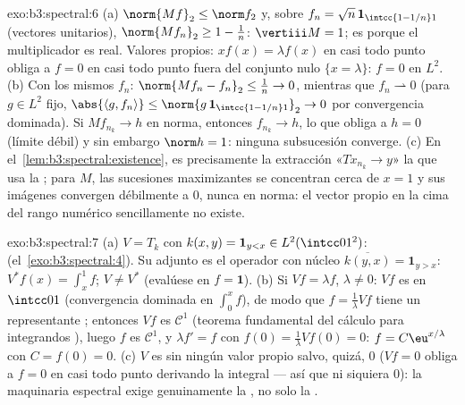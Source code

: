 \begin{solution}{exo:b3:spectral:6}
(a) $\norm{Mf}_2 \leq \norm f_2$ y, sobre $f_n = \sqrt n\,
\mathbf 1_{\intcc{1 - 1/n}1}$ (vectores unitarios), $\norm{Mf_n}_2
\geq 1 - \frac1n$: $\vertiii M = 1$; es
 porque el
multiplicador es real. Valores propios: $xf(x) = \lambda f(x)$ en casi
todo punto obliga a $f = 0$ en casi todo punto fuera del conjunto nulo
$\{x = \lambda\}$: $f =
0$ en $L^2$. (b) Con los mismos $f_n$:
$\norm{Mf_n - f_n}_2 \leq \frac1n \to
0$, mientras que $f_n \rightharpoonup 0$ (para $g \in L^2$ fijo,
$\abs{\langle g, f_n\rangle} \leq \norm{g\,\mathbf
1_{\intcc{1-1/n}1}}_2 \to 0$ por convergencia dominada). Si
$Mf_{n_k} \to h$ en norma, entonces $f_{n_k} \to h$, lo que obliga a
$h = 0$ (límite débil) y sin embargo $\norm h = 1$: ninguna subsucesión
converge. (c) En el~\cref{lem:b3:spectral:existence}, es precisamente la
extracción «$Tx_{n_k} \to y$» la que usa la ; para $M$, las
sucesiones maximizantes se concentran cerca de $x = 1$ y sus imágenes
convergen débilmente a $0$, nunca en norma: el vector propio en la cima
del rango numérico sencillamente no existe.
\end{solution}

\begin{solution}{exo:b3:spectral:7}
(a) $V = T_k$ con $k(x, y) = \mathbf 1_{y < x} \in
L^2(\intcc01^2)$: 
(el~\cref{exo:b3:spectral:4}). Su adjunto es el operador con núcleo
$\overline{k(y,
x)} = \mathbf 1_{y > x}$: $V^*f(x) = \int_x^1f$; $V \neq V^*$ (evalúese
en $f = \mathbf 1$). (b) Si $Vf = \lambda f$, $\lambda \ne 0$: $Vf$ es
 en $\intcc01$
(convergencia dominada en $\int_0^x f$), de modo que $f
= \frac1\lambda Vf$ tiene un representante
; entonces $Vf$ es
$\mathcal C^1$ (teorema fundamental del cálculo para integrandos
), luego $f$ es
$\mathcal C^1$, y $\lambda f' = f$ con $f(0) = \frac1\lambda Vf(0) = 0$:
$f =
C\eu^{x/\lambda}$ con $C = f(0) = 0$. (c) $V$ es
 sin ningún valor propio
salvo, quizá, $0$ ($Vf = 0$ obliga a $f = 0$ en casi todo punto
derivando la integral --- así que ni siquiera $0$): la maquinaria
espectral exige genuinamente la
, no solo la
.
\end{solution}

